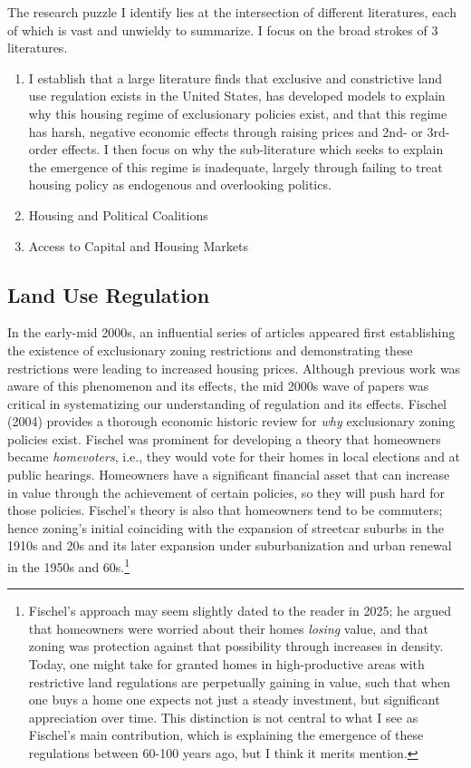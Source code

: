 \documentclass{article}[11pt]
\begin{document}
The research puzzle I identify lies at the intersection of different literatures, each of which is vast and unwieldy to summarize. I focus on the broad strokes of 3 literatures.
\begin{enumerate}
	\item I establish that a large literature finds that exclusive and constrictive land use regulation exists in the United States, has developed models to explain why this housing regime of exclusionary policies exist, and that this regime has harsh, negative economic effects through raising prices and 2nd- or 3rd-order effects. I then focus on why the sub-literature which seeks to explain the emergence of this regime is inadequate, largely through failing to treat housing policy as endogenous and overlooking politics.  
	
	\item Housing and Political Coalitions

	\item Access to Capital and Housing Markets
\end{enumerate}

	\subsection{Land Use Regulation}
In the early-mid 2000s, an influential series of articles appeared first establishing the existence of exclusionary zoning restrictions and demonstrating these restrictions were leading to increased housing prices. Although previous work was aware of this phenomenon and its effects, the mid 2000s wave of papers was critical in systematizing our understanding of regulation and its effects. Fischel (2004) provides a thorough economic historic review for \textit{why} exclusionary zoning policies exist. \citep{fischel2004economic} Fischel was prominent for developing a theory that homeowners became \textit{homevoters}, i.e., they would vote for their homes in local elections and at public hearings. Homeowners have a significant financial asset that can increase in value through the achievement of certain policies, so they will push hard for those policies. Fischel's theory is also that homeowners tend to be commuters; hence zoning's initial coinciding with the expansion of streetcar suburbs in the 1910s and 20s and its later expansion under suburbanization and urban renewal in the 1950s and 60s.\footnote{Fischel's approach may seem slightly dated to the reader in 2025; he argued that homeowners were worried about their homes \textit{losing} value, and that zoning was protection against that possibility through increases in density. Today, one might take for granted homes in high-productive areas with restrictive land regulations are perpetually gaining in value, such that when one buys a home one expects not just a steady investment, but significant appreciation over time. This distinction is not central to what I see as Fischel's main contribution, which is explaining the emergence of these regulations between 60-100 years ago, but I think it merits mention.} 
\end{document}
